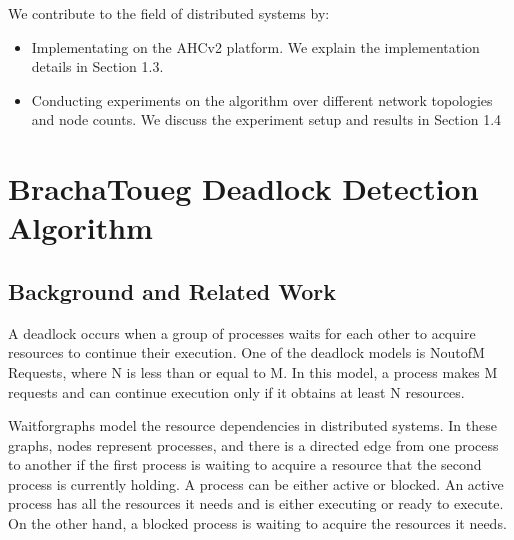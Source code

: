 \documentclass[letterpaper,10pt,english]{sphinxmanual}
\begin{document}
\sphinxAtStartPar
We contribute to the field of distributed systems by:
\begin{itemize}
\item {} 
\sphinxAtStartPar
Implementating {\hyperref[\detokenize{docs/BrachaToueg/algorithm:brachatouegdeadlockdetectionalgorithm}]{}} on the AHCv2 platform. We explain the implementation details in Section 1.3.

\item {} 
\sphinxAtStartPar
Conducting experiments on the algorithm over different network topologies and node counts. We discuss the experiment setup and results in Section 1.4

\end{itemize}

\sphinxstepscope


\section{Bracha\sphinxhyphen{}Toueg Deadlock Detection Algorithm}
\label{\detokenize{docs/BrachaToueg/algorithm:brachatouegalg}}\label{\detokenize{docs/BrachaToueg/algorithm::doc}}

\subsection{Background and Related Work}
\label{\detokenize{docs/BrachaToueg/algorithm:background-and-related-work}}
\sphinxAtStartPar
A deadlock occurs when a group of processes waits for each other to acquire resources to continue their execution. One of the deadlock models is N\sphinxhyphen{}out\sphinxhyphen{}of\sphinxhyphen{}M Requests, where N is less than or equal to M. In this model, a process makes M requests and can continue execution only if it obtains at least N resources.

\sphinxAtStartPar
Wait\sphinxhyphen{}for\sphinxhyphen{}graphs model the resource dependencies in distributed systems.  In these graphs, nodes represent processes, and there is a directed edge from one process to another if the first process is waiting to acquire a resource that the second process is currently holding. A process can be either active or blocked. An active process has all the resources it needs and is either executing or ready to execute. On the other hand, a blocked process is waiting to acquire the resources it needs.
\end{document}
